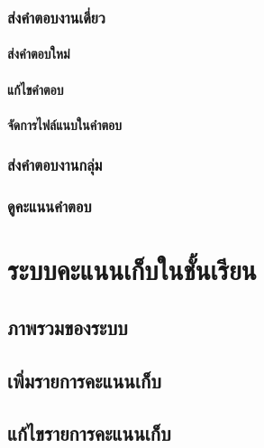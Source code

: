 \documentclass[12pt,oneside]{book}
\makeatletter
\renewcommand\paragraph{\@startsection{paragraph}{4}{\z@}%
                                     {-3.25ex\@plus -1ex \@minus -.2ex}%
                                     {0.0001pt \@plus .2ex}%
                                     {\normalfont\normalsize\bfseries}}
\makeatother
\begin{document}
\subsection{ส่งคำตอบงานเดี่ยว}

\subsubsection{ส่งคำตอบใหม่}

\subsubsection{แก้ไขคำตอบ}

\subsubsection{จัดการไฟล์แนบในคำตอบ}




\subsection{ส่งคำตอบงานกลุ่ม}

\subsection{ดูคะแนนคำตอบ}

\chapter{ระบบคะแนนเก็บในชั้นเรียน}

\section{ภาพรวมของระบบ}

\section{เพิ่มรายการคะแนนเก็บ}

\section{แก้ไขรายการคะแนนเก็บ}
\end{document}
